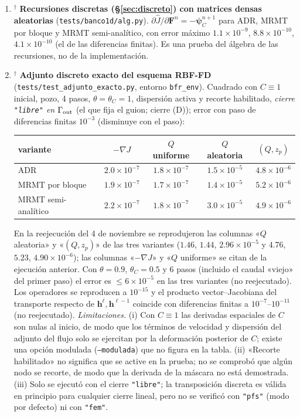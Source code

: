 \documentclass[11pt]{article}
\numberwithin{equation}{section}
\theoremstyle{plain}
\theoremstyle{definition}
\theoremstyle{remark}
\begin{document}
\begin{enumerate}[label=\textbf{V\arabic*.},leftmargin=*,itemsep=0.6em]
\item$^\dagger$ \textbf{Recursiones discretas (\S\ref{sec:discreto}) con matrices densas aleatorias} (\texttt{tests/banco1d/alg.py}). $\partial\hat J/\partial\mathbf{F}^n=-\boldsymbol\psi_C^{n+1}$ para
  ADR, MRMT por bloque y MRMT semi-analítico, con error máximo $1.1\times10^{-9}$, $8.8\times10^{-10}$, $4.1\times10^{-10}$ (el de las diferencias finitas). Es una
  prueba del álgebra de las recursiones, no de la implementación.

\item$^\dagger$ \textbf{Adjunto discreto exacto del esquema RBF-FD} (\texttt{tests/test\_adjunto\_exacto.py}, entorno \texttt{bfr\_env}). Cuadrado con $C\equiv1$ inicial, pozo, 4 pasos,
  $\theta=\theta_C=1$, dispersión activa y recorte habilitado, \emph{cierre \texttt{"libre"} en $\Gamma_{\rm out}$} (el que fija el guion; cierre (D)); error con paso de diferencias finitas $10^{-3}$ (disminuye con el paso):
  \begin{center}\small
  \begin{tabular}{lcccc}
  \toprule
  variante & $-\nabla J$ & $Q$ uniforme & $Q$ aleatoria & $(Q,z_p)$ \\
  \midrule
  ADR & $2.0\times10^{-7}$ & $1.8\times10^{-7}$ & $1.5\times10^{-5}$ & $4.8\times10^{-6}$ \\
  MRMT por bloque & $1.9\times10^{-7}$ & $1.7\times10^{-7}$ & $1.4\times10^{-5}$ & $5.2\times10^{-6}$ \\
  MRMT semi-analítico & $2.2\times10^{-7}$ & $1.8\times10^{-7}$ & $3.0\times10^{-5}$ & $4.9\times10^{-6}$ \\
  \bottomrule
  \end{tabular}
  \end{center}
  En la reejecución del 4 de noviembre se reprodujeron las columnas «$Q$ aleatoria» y «$(Q,z_p)$» de las tres variantes ($1.46$, $1.44$, $2.96\times10^{-5}$ y $4.76$, $5.23$, $4.90\times10^{-6}$); las columnas
  «$-\nabla J$» y «$Q$ uniforme» se citan de la ejecución anterior.
  Con $\theta=0.9$, $\theta_C=0.5$ y 6 pasos (incluido el caudal «viejo» del primer paso) el error es $\le6\times10^{-5}$ en las tres
  variantes (no reejecutado). Los operadores se reproducen a $10^{-15}$ y el producto vector--Jacobiana del transporte respecto de
  $\mathbf{h}^\ell,\mathbf{h}^{\ell-1}$ coincide con diferencias finitas a $10^{-7}$--$10^{-11}$ (no reejecutado).
  \emph{Limitaciones.} (i) Con $C\equiv1$ las derivadas espaciales de $C$ son nulas al inicio, de modo que los términos de velocidad y dispersión del adjunto del flujo solo se ejercitan por la deformación posterior de $C$; existe una opción modulada
  (\texttt{--modulada}) que no figura en la tabla. (ii) «Recorte habilitado» no significa que se active en la prueba; no se comprobó que algún nodo se recorte, de modo que la derivada de la máscara no está demostrada. (iii) Solo se ejecutó con el cierre \texttt{"libre"};
  la transposición discreta es válida en principio para cualquier cierre lineal, pero no se verificó con \texttt{"pfs"} (modo por defecto) ni con \texttt{"fem"}.


\end{enumerate}
\end{document}
